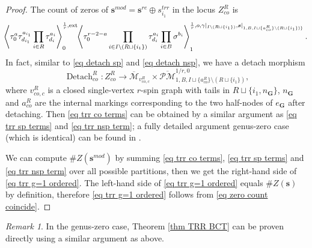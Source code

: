 \documentclass[11pt]{amsart}
\theoremstyle{definition}
\theoremstyle{remark}
\newtheorem{rmk}[dummy]{Remark}
\newcommand{\oPMb}{{\overline{\mathcal{PM}}}}
\newcommand{\<}{\left<}
\renewcommand{\>}{\right>}
\numberwithin{equation}{section}
\def\Mbar{{\overline{\mathcal M}}}
\begin{document}
\begin{proof}
         The count of zeros of $\bm{s}^{mod}=\bm{s}^{re}\oplus s^{trr}_{i_1}$ in the locus $Z_{co}^{R}$ is 
             \begin{equation}\label{eq trr co terms}
                \hspace{-0.1cm}\left\langle \tau_0^{a}\tau_{d_{i_1}}^{a_{i_1}}\prod_{i \in R}\tau_{d_i}^{a_i}\right\rangle^{\frac{1}{r},\text{ext}}_0
                \hspace{-0.1cm}\left\langle \tau_0^{r-2-a}\prod_{i\in I\setminus(R \sqcup\{i_1\})}\tau^{a_i}_{d_i}\prod_{i\in B}\sigma^{b_i}\right\rangle^{\frac{1}{r},o,\gamma\vert_{I\setminus(R \sqcup\{i_1\})},\bm{s}\vert_{1,B,I\sqcup\{a_{co}^R\}\setminus(R \sqcup\{i_1\})\}}}_1.
            \end{equation}
         In fact, similar to \eqref{eq detach sp} and \eqref{eq detach nsp}, we have a detach morphism
        \begin{equation}\label{eq detach co}
         \operatorname{Detach}_{co}^{R}\colon Z^{R}_{co} \to \Mbar_{v_{co,c}^R}\times \oPMb^{1/r,0}_{1,B,I\sqcup \{a_{co}^R\}\setminus (R\sqcup \{i_1\})},
         \end{equation}
         where $v_{co,c}^R$ is a closed single-vertex $r$-spin graph with tails in $R\sqcup \{i_1, n_{\bm{G}}\}$, $n_{\bm{G}}$ and $a_{co}^R$ are the internal markings corresponding to the two half-nodes of $e_{\bm{G}}$ after detaching. Then \eqref{eq trr co terms} can be obtained by a similar argument as \eqref{eq trr sp terms} and \eqref{eq trr nsp term}; a fully detailed argument genus-zero case (which is identical) can be found in \cite[Proof of Lemma 4.14]{BCT2}.

         We can compute $\#Z(\bm{s}^{mod})$ by summing \eqref{eq trr co terms}, \eqref{eq trr sp terms} and \eqref{eq trr nsp term} over all possible partitions, then we get the right-hand side of \eqref{eq trr g=1 ordered}. The left-hand side of \eqref{eq trr g=1 ordered} equals $\#Z(\bm{s})$ by definition, therefore \eqref{eq trr g=1 ordered} follows from \eqref{eq zero count coincide}.

\end{proof}

\begin{rmk}
    In the genus-zero case, Theorem \ref{thm TRR BCT} can be proven directly using a similar argument as above.
\end{rmk}
\end{document}
